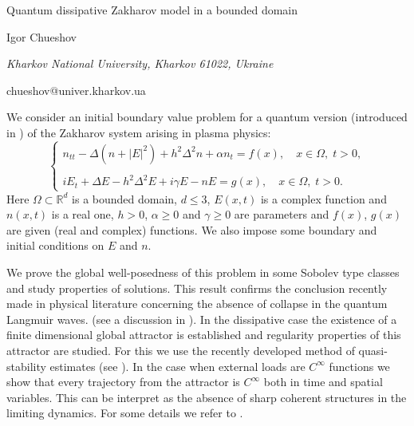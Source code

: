\documentclass[10pt,a4paper]{article}
\def\R{\mathbb{R}}
\begin{document}
\begin{center}

{\Large Quantum dissipative Zakharov model in a bounded domain}

\bigskip


{\sc Igor Chueshov}

{\small\it Kharkov National University, Kharkov 61022, Ukraine}

{\small\rm  chueshov@univer.kharkov.ua}



\end{center}

\bigskip

We consider an initial boundary value problem for  a
quantum version (introduced in  \cite{GHGO-2005}) of the  Zakharov system
arising in plasma physics:
\begin{equation*}
\left\{\begin{array}{l}
n_{tt}-\Delta\left(n+|E|^2\right)+h^2\Delta^2 n+\alpha n_t  =f(x),
\quad x\in\Omega,\; t>0,
\\ \\
i E_t+\Delta E- h^2\Delta^2E  +i\gamma E - n E=g(x),\quad x\in\Omega,\; t>0.
\end{array}\right.
\end{equation*}
Here $\Omega \subset \R^d$ is a bounded domain, $d\le 3$,
$E(x,t)$ is a complex function
and $n(x,t)$ is a real one, $h>0$,  $\alpha\ge 0$
and $\gamma\ge 0$ are  parameters and $f(x)$, $g(x)$ are given
(real and complex) functions. We also impose some boundary and initial conditions
on $E$ and $n$.
\par
We prove the global well-posedness
of this problem in some Sobolev type classes and study properties of
solutions.  This result confirms the conclusion
recently made in physical literature concerning
the absence of collapse in the quantum Langmuir waves.
(see a discussion in \cite{SSS-2009}). 
In the dissipative case the existence of a
finite dimensional global attractor
is  established and regularity properties
of this attractor are studied. For this we use the recently
developed method of  quasi-stability estimates (see \cite{ChuLas,cl-book}).
In the case when external loads are
$C^\infty$ functions we show that every trajectory  from the attractor
is $C^\infty$ both in time and spatial variables.
This can be interpret as the absence of sharp coherent
structures in the limiting dynamics.  For some details we refer to 
\cite{Chu11}.
\end{document}
